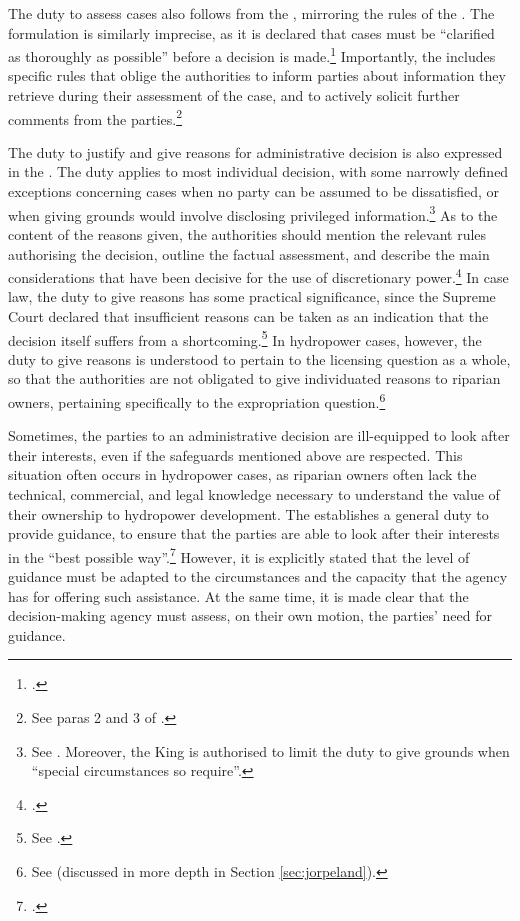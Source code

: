 The duty to assess cases also follows from the \cite{paa67}, mirroring the rules of the \cite{ea59}. The formulation is similarly imprecise, as it is declared that cases must be ``clarified as thoroughly as possible'' before a decision is made.\footcite[17]{paa67} Importantly, the \cite{paa67} includes specific rules that oblige the authorities to inform parties about information they retrieve during their assessment of the case, and to actively solicit further comments from the parties.\footnote{See paras 2 and 3 of \cite[17]{paa67}.}

The duty to justify and give reasons for administrative decision is also expressed in the \cite{paa67}. The duty applies to most individual decision, with some narrowly defined exceptions concerning cases when no party can be assumed to be dissatisfied, or when giving grounds would involve disclosing privileged information.\footnote{See \cite[24]{paa67}. Moreover, the King is authorised to limit the duty to give grounds when ``special circumstances so require''.} As to the content of the reasons given, the authorities should mention the relevant rules authorising the decision, outline the factual assessment, and describe the main considerations that have been decisive for the use of discretionary power.\footcite[25]{paa67} In case law, the duty to give reasons has some practical significance, since the Supreme Court declared that insufficient reasons can be taken as an indication that the decision itself suffers from a shortcoming.\footnote{See \cite{isene81,hauge00}.} In hydropower cases, however, the duty to give reasons is understood to pertain to the licensing question as a whole, so that the authorities are not obligated to give individuated reasons to riparian owners, pertaining specifically to the expropriation question.\footnote{See \cite{sauda09,jorpeland11} (discussed in more depth in Section \ref{sec:jorpeland}).}

Sometimes, the parties to an administrative decision are ill-equipped to look after their interests, even if the safeguards mentioned above are respected. This situation often occurs in hydropower cases, as riparian owners often lack the technical, commercial, and legal knowledge necessary to understand the value of their ownership to hydropower development. The \cite{paa67} establishes a general duty to provide guidance, to ensure that the parties are able to look after their interests in the ``best possible way''.\footcite[11]{paa67} However, it is explicitly stated that the level of guidance must be adapted to the circumstances and the capacity that the agency has for offering such assistance. At the same time, it is made clear that the decision-making agency must assess, on their own motion, the parties' need for guidance.

